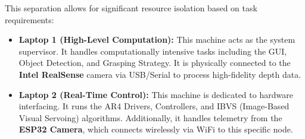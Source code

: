 This separation allows for significant resource isolation based on task requirements:

\begin{itemize}
    \item \textbf{Laptop 1 (High-Level Computation):} This machine acts as the system supervisor. It handles computationally intensive tasks including the GUI, Object Detection, and Grasping Strategy. It is physically connected to the \textbf{Intel RealSense} camera via USB/Serial to process high-fidelity depth data.
    
    \item \textbf{Laptop 2 (Real-Time Control):} This machine is dedicated to hardware interfacing. It runs the AR4 Drivers, Controllers, and IBVS (Image-Based Visual Servoing) algorithms. Additionally, it handles telemetry from the \textbf{ESP32 Camera}, which connects wirelessly via WiFi to this specific node.
\end{itemize}